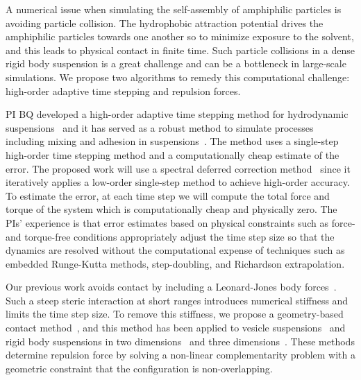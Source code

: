 A numerical issue when simulating the self-assembly of amphiphilic
particles is avoiding particle collision. The hydrophobic attraction
potential drives the amphiphilic particles towards one another so to
minimize exposure to the solvent, and this leads to physical contact in
finite time. Such particle collisions in a dense rigid body suspension
is a great challenge and can be a bottleneck in large-scale simulations.
We propose two algorithms to remedy this computational challenge:
high-order adaptive time stepping and repulsion forces.

PI BQ developed a high-order adaptive time stepping method for
hydrodynamic suspensions~\cite{qua-bir2016} and it has served as a
robust method to simulate processes including mixing and adhesion in
suspensions~\cite{qua-vee-you2019, kab-qua-bir2017}. The method uses
a single-step high-order time stepping method and a computationally
cheap estimate of the error. The proposed work will use a spectral
deferred correction method~\cite{dut-gre-rok2000} since it iteratively
applies a low-order single-step method to achieve high-order accuracy.
To estimate the error, at each time step we will compute the total force
and torque of the system which is computationally cheap and physically
zero. The PIs' experience is that error estimates based on physical
constraints such as force- and torque-free conditions appropriately
adjust the time step size so that the dynamics are resolved without the
computational expense of techniques such as embedded Runge-Kutta
methods, step-doubling, and Richardson extrapolation.

Our previous work avoids contact by including a Leonard-Jones body
forces~\cite{Fu2018_SIAM}. Such a steep steric interaction at short
ranges introduces numerical stiffness and limits the time step size. To
remove this stiffness, we propose a geometry-based contact
method~\cite{har-pon-sor-zor2011}, and this method has been applied to
vesicle suspensions~\cite{lu-rah-zor2017} and rigid body suspensions in
two dimensions~\cite{bys-sha-qua2020} and three
dimensions~\cite{Yan2019}. These methods determine repulsion force by
solving a non-linear complementarity problem with a geometric constraint
that the configuration is non-overlapping.


